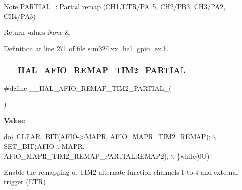 \begin{DoxyNote}{Note}
P\+A\+R\+T\+I\+A\+L\+\_\+: Partial remap (C\+H1/\+E\+T\+R/\+P\+A15, C\+H2/\+P\+B3, C\+H3/\+P\+A2, C\+H4/\+P\+A3) 
\end{DoxyNote}

\begin{DoxyRetVals}{Return values}
{\em None} & \\
\hline
\end{DoxyRetVals}


Definition at line 271 of file stm32f1xx\+\_\+hal\+\_\+gpio\+\_\+ex.\+h.

\mbox{\label{group___g_p_i_o_ex___a_f_i_o___a_f___r_e_m_a_p_p_i_n_g_gade6fd88cc370467cff853b404978190a}} 
\subsubsection{\texorpdfstring{\+\_\+\+\_\+\+H\+A\+L\+\_\+\+A\+F\+I\+O\+\_\+\+R\+E\+M\+A\+P\+\_\+\+T\+I\+M2\+\_\+\+P\+A\+R\+T\+I\+A\+L\+\_}{\_\_HAL\_AFIO\_REMAP\_TIM2\_PARTIAL\_2}}
{\footnotesize\ttfamily \#define \+\_\+\+\_\+\+H\+A\+L\+\_\+\+A\+F\+I\+O\+\_\+\+R\+E\+M\+A\+P\+\_\+\+T\+I\+M2\+\_\+\+P\+A\+R\+T\+I\+A\+L\+\_(\begin{DoxyParamCaption}{ }\end{DoxyParamCaption})}

{\bfseries Value\+:}
\begin{DoxyCode}
\textcolor{keywordflow}{do}\{ CLEAR\_BIT(AFIO->MAPR, AFIO\_MAPR\_TIM2\_REMAP);             \(\backslash\)
                                               SET\_BIT(AFIO->MAPR, AFIO\_MAPR\_TIM2\_REMAP\_PARTIALREMAP2); \(\backslash\)
                                             \}\textcolor{keywordflow}{while}(0U)
\end{DoxyCode}


Enable the remapping of T\+I\+M2 alternate function channels 1 to 4 and external trigger (E\+TR) 

